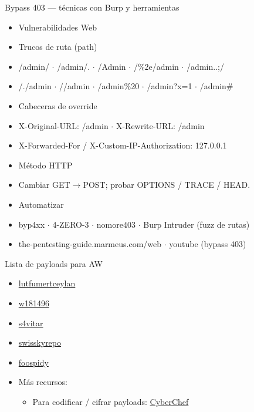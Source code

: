\documentclass[aspectratio=169,10pt]{beamer}
\begin{document}
\begin{frame}[allowframebreaks]{Bypass 403 --- técnicas con Burp y herramientas}
\small
  \begin{itemize}
  \item Vulnerabilidades Web
  \item Trucos de ruta (path)
  \item /admin/ $\cdot$ /admin/. $\cdot$ /Admin $\cdot$ /\%2e/admin $\cdot$ /admin..;/
  \item /./admin $\cdot$ //admin $\cdot$ /admin\%20 $\cdot$ /admin?x=1 $\cdot$ /admin\#
  \item Cabeceras de override
  \item X-Original-URL: /admin $\cdot$ X-Rewrite-URL: /admin
  \item X-Forwarded-For / X-Custom-IP-Authorization: 127.0.0.1
  \item Método HTTP
  \item Cambiar GET$\rightarrow$POST; probar OPTIONS / TRACE / HEAD.
  \item Automatizar
  \item byp4xx $\cdot$ 4-ZERO-3 $\cdot$ nomore403 $\cdot$ Burp Intruder (fuzz de rutas)
  \item the-pentesting-guide.marmeus.com/web $\cdot$ youtube (bypass 403)
  \end{itemize}
\end{frame}

\begin{frame}[allowframebreaks]{Lista de payloads para AW}
\small
  \begin{itemize}
  \item \href{https://github.com/lutfumertceylan/top25-parameter?s=03}{lutfumertceylan}
  \item \href{https://github.com/w181496/Web-CTF-Cheatsheet}{w181496}
  \item \href{https://gist.github.com/s4vitar/b88fefd5d9fbbdcc5f30729f7e06826e\#pentesting-web}{s4vitar}
  \item \href{https://github.com/swisskyrepo/PayloadsAllTheThings}{swisskyrepo}
  \item \href{https://github.com/foospidy/payloads}{foospidy}
  \item Más recursos:
    \begin{itemize}
    \item Para codificar / cifrar payloads: \href{https://github.com/gchq/CyberChef}{CyberChef}
    \end{itemize}
  \end{itemize}
\end{frame}
\end{document}
